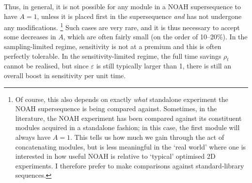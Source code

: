 Thus, in general, it is not possible for any module in a NOAH supersequence to have $A = 1$, unless it is placed first in the supersequence \textit{and} has not undergone any modifications.%
\footnote{Of course, this also depends on exactly \textit{what} standalone experiment the NOAH supersequence is being compared against. Sometimes, in the literature, the NOAH experiment has been compared against its constituent modules acquired in a standalone fashion; in this case, the first module will always have $A = 1$. This tells us how much we gain through the act of concatenating modules, but is less meaningful in the `real world' where one is interested in how useful NOAH is relative to `typical' optimised 2D experiments. I therefore prefer to make comparisons against standard-library sequences.}
Such cases are very rare, and it is thus necessary to accept some decreases in $A$, which are often fairly small (on the order of 10--20\%).
In the sampling-limited regime, sensitivity is not at a premium and this is often perfectly tolerable.
In the sensitivity-limited regime, the full time savings $\rho_t$ cannot be realised, but since $\varepsilon$ is still typically larger than 1, there is still an overall boost in sensitivity per unit time.
